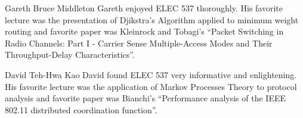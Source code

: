 \documentclass[11pt]{IEEEtran}
\theoremstyle{definition}
\begin{document}


\begin{biography}{Gareth Bruce Middleton} 
Gareth enjoyed ELEC 537 thoroughly. His favorite lecture was the presentation of Djikstra's Algorithm applied to minimum weight routing and favorite paper was Kleinrock and Tobagi's ``Packet Switching in Radio Channels: Part I - Carrier Sense Multiple-Access Modes and Their Throughput-Delay Characteristics''.
\end{biography}
\begin{biography}{David Teh-Hwa Kao} 
David found ELEC 537 very informative and enlightening. His favorite lecture was the application of Markov Processes Theory to protocol analysis and favorite paper was Bianchi's ``Performance analysis of the IEEE 802.11 distributed coordination function''.
\end{biography}
\end{document}
